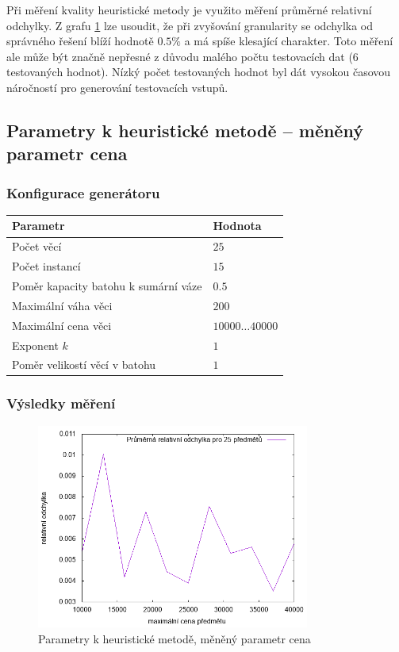 \documentclass{article}
\begin{document}
Při měření kvality heuristické metody je využito měření průměrné relativní odchylky.
Z grafu \ref{fig:g4} lze usoudit, že při zvyšování granularity se odchylka od správného řešení blíží hodnotě $0.5 \%$ a má spíše klesající charakter.
Toto měření ale může být značně nepřesné z důvodu malého počtu testovacích dat (6 testovaných hodnot).
Nízký počet testovaných hodnot byl dát vysokou časovou náročností pro generování testovacích vstupů.

\subsection{Parametry k heuristické metodě -- měněný parametr cena}

\subsubsection*{Konfigurace generátoru}

\begin{table}[H]
\centering
    \begin{tabular}{ |l|l| } 
        \hline
        Parametr & Hodnota \\
        \hline
        \hline
        Počet věcí & $25$ \\
        Počet instancí & $15$ \\
        Poměr kapacity batohu k sumární váze & $0.5$ \\
        Maximální váha věci & $200$ \\
        Maximální cena věci & $10000 \dots 40000$ \\
        Exponent $k$ & $1$ \\
        Poměr velikostí věcí v batohu & $1$ \\
        \hline
    \end{tabular}
\end{table}

\subsubsection*{Výsledky měření}

\begin{figure}[H]
    \centering
    \includegraphics[width=0.8\textwidth]{inputs-heuristic-price/inputs-heuristic-price.png}
    \caption{Parametry k heuristické metodě, měněný parametr cena}
    \label{fig:g4}
\end{figure}
\end{document}

